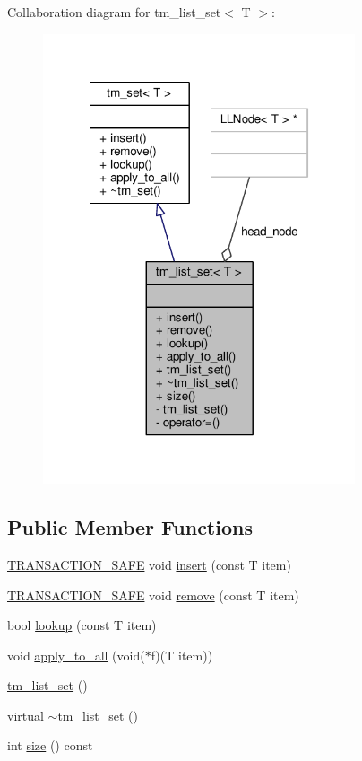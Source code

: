 Collaboration diagram for tm\-\_\-list\-\_\-set$<$ T $>$\-:
\nopagebreak
\begin{figure}[H]
\begin{center}
\leavevmode
\includegraphics[width=261pt]{classtm__list__set__coll__graph}
\end{center}
\end{figure}
\subsection*{Public Member Functions}
\begin{DoxyCompactItemize}
\item 
\hyperlink{common_8hpp_a77872cb9748b204f4b1c44ba6141b862}{T\-R\-A\-N\-S\-A\-C\-T\-I\-O\-N\-\_\-\-S\-A\-F\-E} void \hyperlink{classtm__list__set_a7b2de448d04c0682cb276bfdcdc44034}{insert} (const T item)
\item 
\hyperlink{common_8hpp_a77872cb9748b204f4b1c44ba6141b862}{T\-R\-A\-N\-S\-A\-C\-T\-I\-O\-N\-\_\-\-S\-A\-F\-E} void \hyperlink{classtm__list__set_a6b0574bddef610f8dbf80c80b7210140}{remove} (const T item)
\item 
bool \hyperlink{classtm__list__set_ad5373e6893f79c296f5c9b91779485d7}{lookup} (const T item)
\item 
void \hyperlink{classtm__list__set_a7f9b4de667c8728bcd25675f48339449}{apply\-\_\-to\-\_\-all} (void($\ast$f)(T item))
\item 
\hyperlink{classtm__list__set_a5c301da4319ba7139feed749e4b47d78}{tm\-\_\-list\-\_\-set} ()
\item 
virtual \hyperlink{classtm__list__set_a13086b41790d602ec7c2320a36c94c66}{$\sim$tm\-\_\-list\-\_\-set} ()
\item 
int \hyperlink{classtm__list__set_ac54f2e79061bbf6a5dc5d07923e7bc47}{size} () const 
\end{DoxyCompactItemize}

